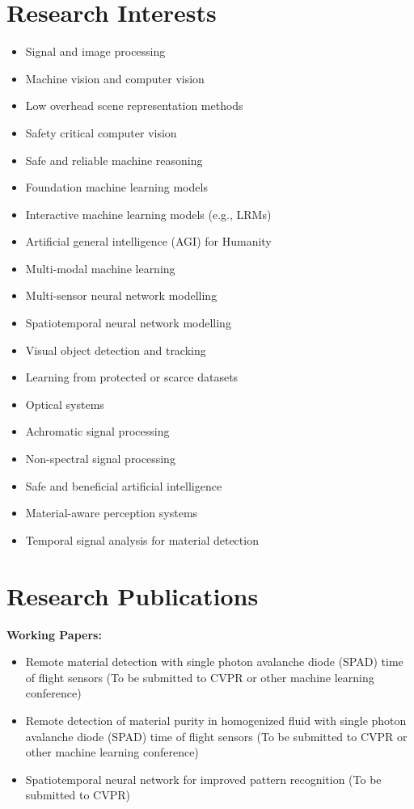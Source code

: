 \documentclass[11pt,a4paper]{article}
\begin{document}
\section*{Research Interests}
\begin{itemize}[leftmargin=*,nosep]
    \item Signal and image processing
    \item Machine vision and computer vision
    \item Low overhead scene representation methods
    \item Safety critical computer vision
    \item Safe and reliable machine reasoning
    \item Foundation machine learning models
    \item Interactive machine learning models (e.g., LRMs)
    \item Artificial general intelligence (AGI) for Humanity
    \item Multi-modal machine learning
    \item Multi-sensor neural network modelling
    \item Spatiotemporal neural network modelling
    \item Visual object detection and tracking
    \item Learning from protected or scarce datasets
    \item Optical systems
    \item Achromatic signal processing
    \item Non-spectral signal processing
    \item Safe and beneficial artificial intelligence
    \item Material-aware perception systems
    \item Temporal signal analysis for material detection
\end{itemize}

\section*{Research Publications}
\textbf{Working Papers:}
\begin{itemize}[leftmargin=*,nosep]
    \item Remote material detection with single photon avalanche diode (SPAD) time of flight sensors (To be submitted to CVPR or other machine learning conference)
    \item Remote detection of material purity in homogenized fluid with single photon avalanche diode (SPAD) time of flight sensors (To be submitted to CVPR or other machine learning conference)
    \item Spatiotemporal neural network for improved pattern recognition (To be submitted to CVPR)
\end{itemize}
\end{document}
